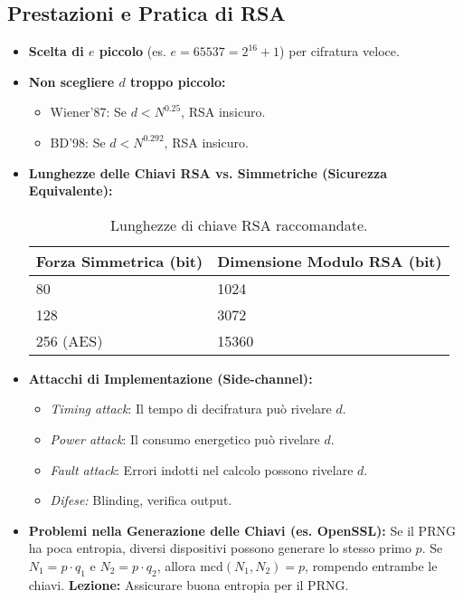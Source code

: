 \subsection{Prestazioni e Pratica di RSA}
\begin{itemize}
    \item \textbf{Scelta di $e$ piccolo} (es. $e=65537 = 2^{16}+1$) per cifratura veloce.
    \item \textbf{Non scegliere $d$ troppo piccolo:}
    \begin{itemize}
        \item Wiener'87: Se $d < N^{0.25}$, RSA insicuro.
        \item BD'98: Se $d < N^{0.292}$, RSA insicuro.
    \end{itemize}
    \item \textbf{Lunghezze delle Chiavi RSA vs. Simmetriche (Sicurezza Equivalente):}
    \begin{table}[H]
        \centering
        \begin{tabular}{|l|l|}
            \hline
            \rowcolor{bg_custom}
            \textbf{\sffamily Forza Simmetrica (bit)} & \textbf{\sffamily Dimensione Modulo RSA (bit)} \\ \hline \hline
            80                               & 1024                              \\ \hline
            128                              & 3072                              \\ \hline
            256 (AES)                        & 15360                             \\ \hline
        \end{tabular}
        \caption{Lunghezze di chiave RSA raccomandate.}
        \label{tab:rsa_keys}
    \end{table}
    \item \textbf{Attacchi di Implementazione (Side-channel):}
    \begin{itemize}
        \item \textit{Timing attack}: Il tempo di decifratura può rivelare $d$.
        \item \textit{Power attack}: Il consumo energetico può rivelare $d$.
        \item \textit{Fault attack}: Errori indotti nel calcolo possono rivelare $d$.
        \item \textit{Difese:} Blinding, verifica output.
    \end{itemize}
    \item \textbf{Problemi nella Generazione delle Chiavi (es. OpenSSL):}
    Se il PRNG ha poca entropia, diversi dispositivi possono generare lo stesso primo $p$.
    Se $N_1 = p \cdot q_1$ e $N_2 = p \cdot q_2$, allora $\text{mcd}(N_1, N_2) = p$, rompendo entrambe le chiavi.
    \textbf{Lezione:} Assicurare buona entropia per il PRNG.
\end{itemize}

